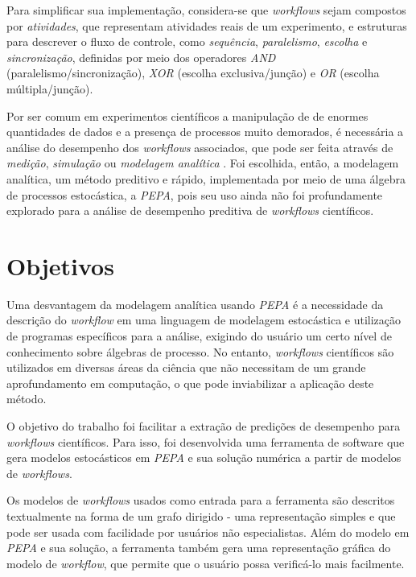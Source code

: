 \documentclass[a4paper,11pt]{article}
\begin{document}
    Para simplificar sua implementação, considera-se que \emph{workflows} sejam compostos por \emph{atividades}, que representam atividades reais de um experimento, e estruturas para descrever o fluxo de controle, como \emph{sequência}, \emph{paralelismo}, \emph{escolha} e \emph{sincronização}, definidas por meio dos operadores \emph{AND} (paralelismo/sincronização), \emph{XOR} (escolha exclusiva/junção) e \emph{OR} (escolha múltipla/junção).

        Por ser comum em experimentos científicos a manipulação de de enormes quantidades de dados e a presença de processos muito demorados, é necessária a análise do desempenho dos \emph{workflows} associados, que pode ser feita através de \emph{medição}, \emph{simulação} ou \emph{modelagem analítica} \cite{phd:kelly11}. Foi escolhida, então, a modelagem analítica, um método preditivo e rápido, implementada por meio de uma álgebra de processos estocástica, a \emph{PEPA}, pois seu uso ainda não foi profundamente explorado para a análise de desempenho preditiva de \emph{workflows} científicos.

    \section{Objetivos}

        Uma desvantagem da modelagem analítica usando \emph{PEPA} é a necessidade da descrição do \emph{workflow} em uma linguagem de modelagem estocástica e utilização de programas específicos para a análise, exigindo do usuário um certo nível de conhecimento sobre álgebras de processo. No entanto, \emph{workflows} científicos são utilizados em diversas áreas da ciência que não necessitam de um grande aprofundamento em computação, o que pode inviabilizar a aplicação deste método.

        O objetivo do trabalho foi facilitar a extração de predições de desempenho para \emph{workflows} científicos. Para isso, foi desenvolvida uma ferramenta de software que gera modelos estocásticos em \emph{PEPA} e sua solução numérica a partir de modelos de \emph{workflows}.

        Os modelos de \emph{workflows} usados como entrada para a ferramenta são descritos textualmente na forma de um grafo dirigido - uma representação simples e que pode ser usada com facilidade por usuários não especialistas. Além do modelo em \emph{PEPA} e sua solução, a ferramenta também gera uma representação gráfica do modelo de \emph{workflow}, que permite que o usuário possa verificá-lo mais facilmente.
\end{document}
